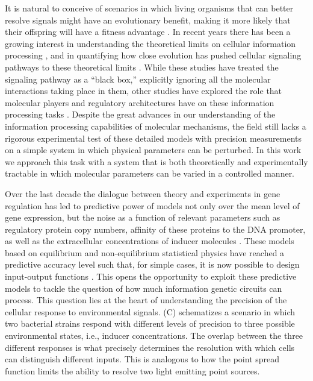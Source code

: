 It is natural to conceive of scenarios in which living organisms that can
better resolve signals might have an evolutionary benefit, making it more
likely that their offspring will have a fitness advantage \cite{Taylor2007}. In
recent years there has been a growing interest in understanding the theoretical
limits on cellular information processing \cite{Bialek2005, Gregor2007}, and in
quantifying how close evolution has pushed cellular signaling pathways to these
theoretical limits \cite{Tkacik2008, Dubuis2013, Petkova2019}. While these
studies have treated the signaling pathway as a ``black box,'' explicitly
ignoring all the molecular interactions taking place in them, other studies
have explored the role that molecular players and regulatory architectures have
on these information processing tasks \cite{Rieckh2014, Ziv2007, Voliotis2014a,
Tostevin2009, Tkacik2011, Tkacik2008a, Tabbaa2014}. Despite the great advances
in our understanding of the information processing capabilities of molecular
mechanisms, the field still lacks a rigorous experimental test of these
detailed models with precision measurements on a simple system in which
physical parameters can be perturbed. In this work we approach this task with a
system that is both theoretically and experimentally tractable in which
molecular parameters can be varied in a controlled manner.

Over the last decade the dialogue between theory and experiments in gene
regulation has led to predictive power of models not only over the mean level
of gene expression, but the noise as a function of relevant parameters such as
regulatory protein copy numbers, affinity of these proteins to the DNA
promoter, as well as the extracellular concentrations of inducer molecules
\cite{Golding2005, Garcia2011c, Vilar2013, Xu2015}. These models based on
equilibrium and non-equilibrium statistical physics have reached a predictive
accuracy level such that, for simple cases, it is now possible to design
input-output functions \cite{Brewster2012, Barnes2019}. This opens the
opportunity to exploit these predictive models to tackle the question of how
much information genetic circuits can process. This question lies at the heart
of understanding the precision of the cellular response to environmental
signals. (C) schematizes a scenario in which two bacterial
strains respond with different levels of precision to three possible
environmental states, i.e., inducer concentrations. The overlap between the
three different responses is what precisely determines the resolution with
which cells can distinguish different inputs. This is analogous to how the
point spread function limits the ability to resolve two light emitting point
sources.

